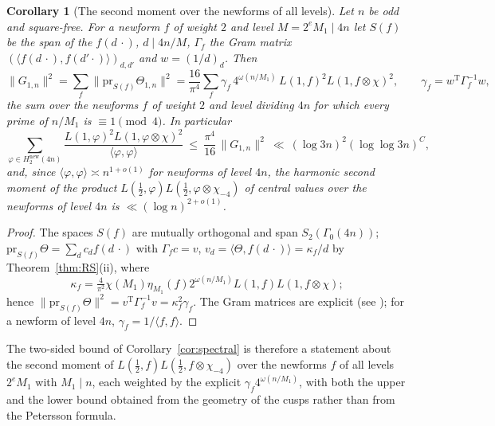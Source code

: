 ﻿\documentclass[11pt]{amsart}
\newtheorem{corollary}[theorem]{Corollary}
\theoremstyle{remark}
\begin{document}
\begin{corollary}[The second moment over the newforms of all levels]\label{cor:newmoment}
Let $n$ be odd and square-free. For a newform $f$ of weight $2$ and level $M=2^eM_1\mid4n$ let $S(f)$ be the span of the $f(d\,\cdot)$, $d\mid4n/M$, $\Gamma_f$ the Gram matrix $(\langle f(d\,\cdot),f(d'\cdot)\rangle)_{d,d'}$ and $w=(1/d)_d$. Then
\[
\|G_{1,n}\|^2=\sum_{f}\bigl\|\mathrm{pr}_{S(f)}\Theta_{1,n}\bigr\|^2=\frac{16}{\pi^4}\sum_{f}\gamma_f\,4^{\omega(n/M_1)}\,L(1,f)^2L(1,f\otimes\chi)^2,\qquad \gamma_f=w^{\mathrm T}\Gamma_f^{-1}w,
\]
the sum over the newforms $f$ of weight $2$ and level dividing $4n$ for which every prime of $n/M_1$ is $\equiv1\pmod 4$. In particular
\[
\sum_{\varphi\in H_2^{\mathrm{new}}(4n)}\frac{L(1,\varphi)^2L(1,\varphi\otimes\chi)^2}{\langle\varphi,\varphi\rangle}\ \le\ \frac{\pi^4}{16}\,\|G_{1,n}\|^2\ \ll\ (\log3n)^2(\log\log3n)^{C},
\]
and, since $\langle\varphi,\varphi\rangle\asymp n^{1+o(1)}$ for newforms of level $4n$, the harmonic second moment of the product $L(\frac12,\varphi)L(\frac12,\varphi\otimes\chi_{-4})$ of central values over the newforms of level $4n$ is $\ll(\log n)^{2+o(1)}$.
\end{corollary}
\begin{proof}
The spaces $S(f)$ are mutually orthogonal and span $S_2(\Gamma_0(4n))$; $\mathrm{pr}_{S(f)}\Theta=\sum_dc_df(d\,\cdot)$ with $\Gamma_fc=v$, $v_d=\langle\Theta,f(d\,\cdot)\rangle=\kappa_f/d$ by Theorem~\ref{thm:RS}(ii), where
\[
\kappa_f=\tfrac4{\pi^2}\chi(M_1)\eta_{M_1}(f)2^{\omega(n/M_1)}L(1,f)L(1,f\otimes\chi);
\]
hence $\|\mathrm{pr}_{S(f)}\Theta\|^2=v^{\mathrm T}\Gamma_f^{-1}v=\kappa_f^2\gamma_f$. The Gram matrices are explicit (see \cite[Section~2]{ILS}); for a newform of level $4n$, $\gamma_f=1/\langle f,f\rangle$.
\end{proof}

The two-sided bound of Corollary~\ref{cor:spectral} is therefore a statement about the second moment of $L(\frac12,f)L(\frac12,f\otimes\chi_{-4})$ over the newforms $f$ of all levels $2^eM_1$ with $M_1\mid n$, each weighted by the explicit $\gamma_f4^{\omega(n/M_1)}$, with both the upper and the lower bound obtained from the geometry of the cusps rather than from the Petersson formula.
\end{document}
